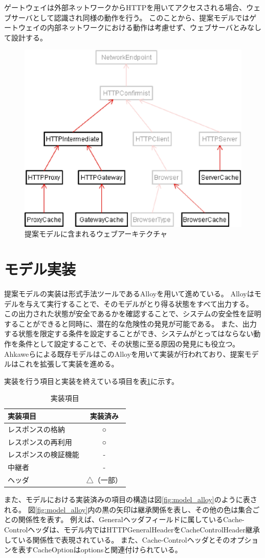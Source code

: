 \documentclass{css}
\begin{document}
ゲートウェイは外部ネットワークからHTTPを用いてアクセスされる場合、ウェブサーバとして認識され同様の動作を行う。
このことから、提案モデルではゲートウェイの内部ネットワークにおける動作は考慮せず、ウェブサーバとみなして設計する。

\begin{figure}[htb]
\centering
\includegraphics[width=0.8\hsize]{model_archi.eps}
\caption{提案モデルに含まれるウェブアーキテクチャ}
\label{fig:model_header}
\end{figure}

\section{モデル実装}
提案モデルの実装は形式手法ツールであるAlloyを用いて進めている。
\color{red}
Alloyはモデルを与えて実行することで、そのモデルがとり得る状態をすべて出力する。
この出力された状態が安全であるかを確認することで、システムの安全性を証明することができると同時に、潜在的な危険性の発見が可能である。
また、出力する状態を限定する条件を設定することができ、システムがとってはならない動作を条件として設定することで、その状態に至る原因の発見にも役立つ。
\color{black}
Ahkaweらによる既存モデル\cite{webmodel}はこのAlloyを用いて実装が行われており、提案モデルはこれを拡張して実装を進める。

\color{red}
実装を行う項目と実装を終えている項目を表\ref{tb:model_implement}に示す。
\begin{table}[htb]
\centering
\label{tb:model_implement}
\caption{実装項目}
\begin{tabular}{l|c}
実装項目 & 実装済み \\ \hline
レスポンスの格納 & ○ \\
レスポンスの再利用 & ○ \\
レスポンスの検証機能 & - \\
中継者 & - \\
ヘッダ & △（一部） \\
\end{tabular}
\end{table}
また、モデルにおける実装済みの項目の構造は図\ref{fig:model_alloy}のように表される。
図\ref{fig:model_alloy}内の黒の矢印は継承関係を表し、その他の色は集合ごとの関係性を表す。
例えば、Generalヘッダフィールドに属しているCache-Controlヘッダは、モデル内ではHTTPGeneralHeaderをCacheControlHeader継承している関係性で表現されている。
また、Cache-Controlヘッダとそのオプションを表すCacheOptionはoptionsと関連付けられている。
\color{black}
\end{document}
